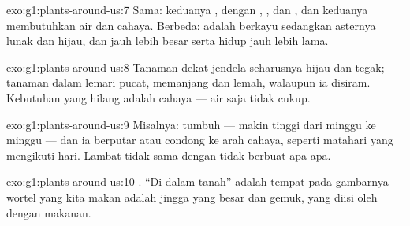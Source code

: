 \begin{solution}{exo:g1:plants-around-us:7}
Sama: keduanya , dengan , ,  dan , dan
keduanya membutuhkan air dan cahaya. Berbeda:   adalah
 berkayu sedangkan   asternya lunak dan hijau,
dan  jauh lebih besar serta hidup jauh lebih lama.
\end{solution}

\begin{solution}{exo:g1:plants-around-us:8}
Tanaman dekat jendela seharusnya hijau dan tegak; tanaman dalam lemari
pucat, memanjang dan lemah, walaupun ia disiram. Kebutuhan yang hilang
adalah cahaya --- air saja tidak cukup.
\end{solution}

\begin{solution}{exo:g1:plants-around-us:9}
Misalnya:  tumbuh --- makin tinggi dari minggu ke minggu
--- dan ia berputar atau condong ke arah cahaya, seperti 
matahari yang mengikuti hari. Lambat tidak sama dengan tidak berbuat
apa-apa.
\end{solution}

\begin{solution}{exo:g1:plants-around-us:10}
. ``Di dalam tanah'' adalah tempat  pada gambarnya ---
wortel yang kita makan adalah  jingga yang besar dan gemuk, yang
diisi oleh  dengan makanan.
\end{solution}

